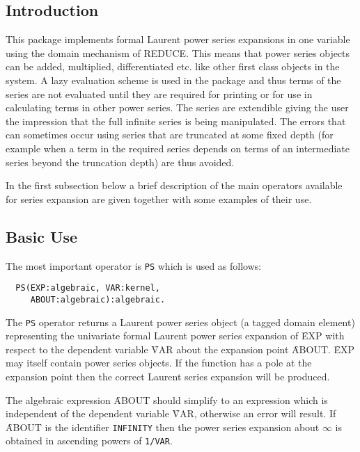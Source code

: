 
 
 
\subsection{Introduction}
This package implements formal Laurent power series expansions in one
variable using the domain mechanism of REDUCE. This means that power
series objects can be added, multiplied, differentiated etc. like other
first class objects in the system. A lazy evaluation scheme is used in
the package and thus terms of the series are not evaluated until they
are required for printing or for use in calculating terms in other
power series. The series are extendible giving the user the impression
that the full infinite series is being manipulated.  The errors that
can sometimes occur using series that are truncated at some fixed depth
(for example when a term in the required series depends on terms of an
intermediate series beyond the truncation depth) are thus avoided.

In the first subsection below a brief description of the main operators
available for series expansion are given together with some examples of
their use.

\subsection{Basic Use}
\hypertarget{operator:PS}{}
The most important operator is  \texttt{PS} which is used as follows:
\hypertarget{operator:PS}{}
\begin{verbatim}
  PS(EXP:algebraic, VAR:kernel, 
     ABOUT:algebraic):algebraic.
\end{verbatim}

The \texttt{PS} operator returns a Laurent power series object (a tagged domain
element) representing the univariate formal Laurent power series expansion of
\f{EXP} with respect to the dependent variable \f{VAR} about the expansion point
\f{ABOUT}.  \f{EXP} may itself contain power series objects.
If the function has a pole at the expansion point then the correct
Laurent series expansion will be produced.

The algebraic expression \f{ABOUT} should simplify to an expression
which is independent of the dependent variable \f{VAR}, otherwise
an error will result.  If \f{ABOUT} is the identifier \texttt{INFINITY}
then the power series expansion about $\infty$ is obtained in ascending
powers of \texttt{1/VAR}.

